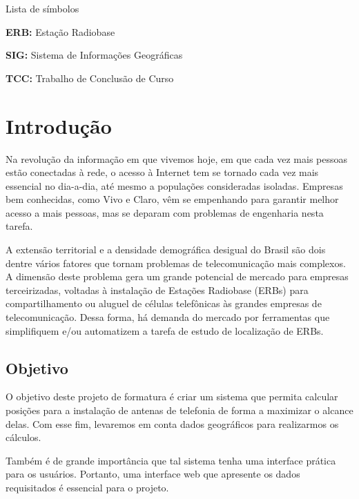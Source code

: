 \documentclass[]{politex}
\begin{document}
\listadefiguras
\listadetabelas

\begin{pretextualsection}{Lista de símbolos}

\textbf{ERB:} Estação Radiobase

\textbf{SIG:} Sistema de Informações Geográficas

\textbf{TCC:} Trabalho de Conclusão de Curso

\end{pretextualsection}

\sumario




\chapter{Introdução}
Na revolução da informação em que vivemos hoje, em que cada vez mais pessoas
estão conectadas à rede, o acesso à Internet tem se tornado cada vez mais
essencial no dia-a-dia, até mesmo a populações consideradas isoladas. Empresas
bem conhecidas, como Vivo e Claro, vêm se empenhando para garantir melhor
acesso a mais pessoas, mas se deparam com problemas de engenharia nesta
tarefa.

A extensão territorial e a densidade demográfica desigual do Brasil são dois
dentre vários fatores que tornam problemas de telecomunicação mais complexos.
A dimensão deste problema gera um grande potencial de mercado para empresas
terceirizadas, voltadas à instalação de Estações Radiobase (ERBs) para
compartilhamento ou aluguel de células telefônicas às grandes empresas de
telecomunicação. Dessa forma, há demanda do mercado por ferramentas que
simplifiquem e/ou automatizem a tarefa de estudo de localização de ERBs.

\section{Objetivo}
O objetivo deste projeto de formatura é criar um sistema que permita calcular
posições para a instalação de antenas de telefonia de forma a maximizar o
alcance delas. Com esse fim, levaremos em conta dados geográficos para
realizarmos os cálculos.

Também é de grande importância que tal sistema tenha uma interface prática
para os usuários. Portanto, uma interface web que apresente os dados
requisitados é essencial para o projeto.
\end{document}
